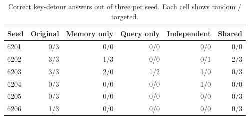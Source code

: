 \begin{table}[H]
\centering
\small
\caption{Correct key-detour answers out of three per seed. Each cell shows random / targeted.}
\begin{tabular}{lrrrrr}
\toprule
Seed & Original & Memory only & Query only & Independent & Shared \\
\midrule
6201 & 0/3 & 0/0 & 0/0 & 0/0 & 0/0 \\
6202 & 3/3 & 1/3 & 0/0 & 0/1 & 2/3 \\
6203 & 3/3 & 2/0 & 1/2 & 1/0 & 0/3 \\
6204 & 0/3 & 0/0 & 0/0 & 1/0 & 0/0 \\
6205 & 0/3 & 0/0 & 0/0 & 0/0 & 0/3 \\
6206 & 1/3 & 0/0 & 0/0 & 0/0 & 0/3 \\
\bottomrule
\end{tabular}
\end{table}
